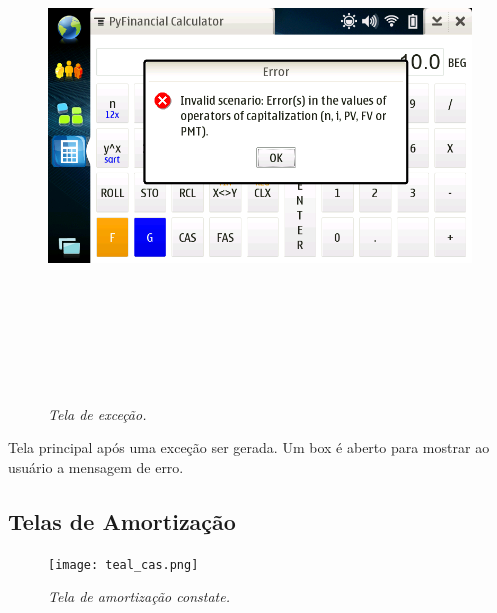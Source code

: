 \begin{figure}[!h]
 \includegraphics[height = 14cm]{tela_error.png}
 \caption{\it Tela de exceção.} \label{tab:tela_error}
\end{figure}

Tela principal após uma exceção ser gerada. Um box é aberto para mostrar ao usuário a
mensagem de erro.


\subsection{Telas de Amortização}

\begin{figure}[!h]
 \texttt{[image: teal\_cas.png]}
 \caption{\it Tela de amortização constate.} \label{tab:tela_cas}
\end{figure}

